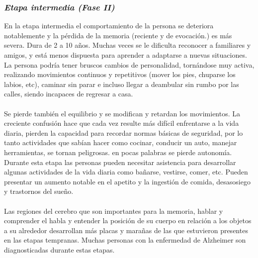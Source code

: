 \documentclass[smallextended, 12pt]{article}
\begin{document}
	\subsubsection{\textit{Etapa intermedia (Fase II) }}
	En la etapa intermedia el comportamiento de la persona se deteriora notablemente y la p\'erdida de la memoria (reciente y de evocaci\'on.) es m\'as severa. Dura de 2 a 10 a\~nos. Muchas veces se le dificulta reconocer a familiares y amigos, y est\'a menos dispuesta para aprender a adaptarse a nuevas situaciones. La persona podr\'ia tener bruscos cambios de personalidad, torn\'andose muy activa, realizando movimientos continuos y repetitivos (mover los pies, chuparse los labios, etc), caminar sin parar e incluso llegar a deambular sin rumbo por las calles, siendo incapaces de regresar a casa. \cite{ref3} \cite{ref8}\\
	\\
	Se pierde tambi\'en el equilibrio y se modifican y retardan los movimientos. La creciente confusi\'on hace que cada vez resulte m\'as dif\'icil enfrentarse a la vida diaria, pierden la capacidad para recordar normas b\'asicas de seguridad, por lo tanto actividades que sab\'ian hacer como cocinar, conducir un auto, manejar herramientas, se tornan peligrosas. en pocas palabras se pierde autonom\'ia.	Durante esta etapa las personas pueden necesitar asistencia para desarrollar algunas actividades de la vida diaria como ba\~narse, vestirse, comer, etc. Pueden presentar un aumento notable en el apetito y la ingesti\'on de comida, desasosiego y trastornos del sue\~no. \cite{ref3} \cite{ref8}\\
	\\
	Las regiones del cerebro que son importantes para la memoria, hablar y comprender el habla y entender la posici\'on de su cuerpo en relaci\'on a los objetos a su alrededor desarrollan m\'as placas y mara\~nas de las que estuvieron presentes en las etapas tempranas. Muchas personas con la enfermedad de Alzheimer son diagnosticadas durante estas etapas. \cite{ref3}
	
\end{document}
